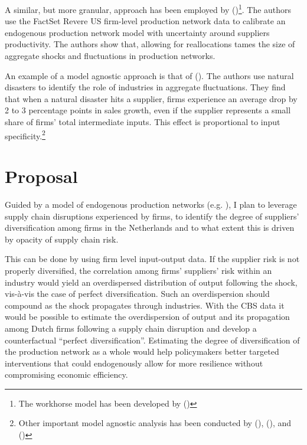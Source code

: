 \documentclass[american, abstract=on]{scrartcl}
\newcommand{\citein}[1]{\citeauthor{#1} (\citeyear{#1})}
\begin{document}
A similar, but more granular, approach has been employed by \citein{mathieu_taschereau-dumouchel_cascades_2020}\footnote{The workhorse model has been developed by \citein{acemoglu_endogenous_2020}}. The authors use the FactSet Revere US firm-level production network data to calibrate an endogenous production network model with uncertainty around suppliers productivity. The authors show that, allowing for reallocations tames the size of aggregate shocks and fluctuations in production networks.

An example of a model agnostic approach is that of \citein{barrot_input_2016}. The authors use natural disasters to identify the role of industries in aggregate fluctuations. They find that when a natural disaster hits a supplier, firms experience an average drop by 2 to 3 percentage points in sales growth, even if the supplier represents a small share of firms' total intermediate inputs. This effect is proportional to input specificity.\footnote{Other important model agnostic analysis has been conducted by \citein{luttmer_selection_2007}, \citein{atalay_network_2011}, and \citein{mackay_how_2020}}

\section{Proposal}

Guided by a model of endogenous production networks (e.g. \cite{kopytov_endogenous_2021,elliott_supply_2022}), I plan to leverage supply chain disruptions experienced by firms, to identify the degree of suppliers' diversification among firms in the Netherlands and to what extent this is driven by opacity of supply chain risk.

This can be done by using firm level input-output data. If the supplier risk is not properly diversified, the correlation among firms' suppliers' risk within an industry would yield an overdispersed distribution of output following the shock, vis-à-vis the case of perfect diversification. Such an overdispersion should compound as the shock propagates through industries. With the CBS data it would be possible to estimate the overdispersion of output and its propagation among Dutch firms following a supply chain disruption and develop a counterfactual ``perfect diversification''. Estimating the degree of diversification of the production network as a whole would help policymakers better targeted interventions that could endogenously allow for more resilience without compromising economic efficiency.
\end{document}
